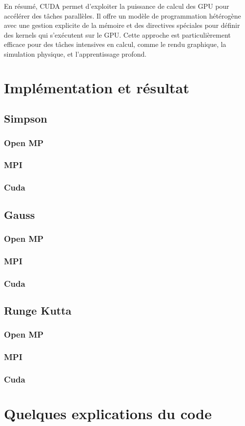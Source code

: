 \documentclass[10pt,a4paper]{article}
\begin{document}
En résumé, CUDA permet d'exploiter la puissance de calcul des GPU pour accélérer des tâches parallèles. Il offre un modèle de programmation hétérogène avec une gestion explicite de la mémoire et des directives spéciales pour définir des kernels qui s'exécutent sur le GPU. Cette approche est particulièrement efficace pour des tâches intensives en calcul, comme le rendu graphique, la simulation physique, et l'apprentissage profond.


\section{Implémentation et résultat}

\subsection{Simpson}

\subsubsection{Open MP}
\subsubsection{MPI}
\subsubsection{Cuda}

\subsection{Gauss}

\subsubsection{Open MP}
\subsubsection{MPI}
\subsubsection{Cuda}

\subsection{Runge Kutta}

\subsubsection{Open MP}
\subsubsection{MPI}
\subsubsection{Cuda}


\section{Quelques explications du code}
\end{document}
